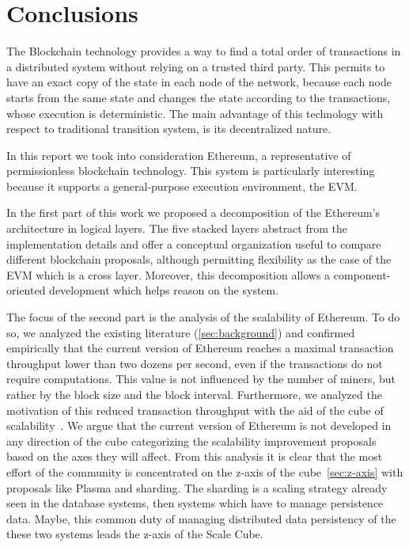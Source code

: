 \section{Conclusions}
\label{sec:conclusions}
The Blockchain technology provides a way to find a total order of transactions
in a distributed system without relying on a trusted third party. This permits
to have an exact copy of the state in each node of the network, because each
node starts from the same state and changes the state according to the
transactions, whose execution is deterministic. The main advantage of this
technology with respect to traditional transition system, is its decentralized
nature.

In this report we took into consideration Ethereum, a representative of
permissionless blockchain technology. This system is particularly interesting
because it supports a general-purpose execution environment, the EVM.

In the first part of this work we proposed a decomposition of the Ethereum's
architecture in logical layers. The five stacked layers abstract from the
implementation details and offer a conceptual organization useful to compare
different blockchain proposals, although permitting flexibility as the case of
the EVM which is a cross layer. Moreover, this decomposition allows a
component-oriented development which helps reason on the system.

The focus of the second part is the analysis of the scalability of Ethereum. To
do so, we analyzed the existing literature (\autoref{sec:background}) and
confirmed empirically that the current version of Ethereum reaches a maximal
transaction throughput lower than two dozens per second, even if the
transactions do not require computations. This value is not influenced by the
number of miners, but rather by the block size and the block interval.
Furthermore, we analyzed the motivation of this reduced transaction throughput
with the aid of the cube of scalability~\cite{bib:art-of-scalability}. We argue
that the current version of Ethereum is not developed in any direction of the
cube categorizing the scalability improvement proposals based on the axes they
will affect. From this analysis it is clear that the most effort of the
community is concentrated on the z-axis of the cube~\autoref{sec:z-axis} with
proposals like Plasma and sharding. The sharding is a scaling strategy already
seen in the database systems, then systems which have to manage persistence
data. Maybe, this common duty of managing distributed data persistency of the
these two systems leads the z-axis of the Scale Cube.
